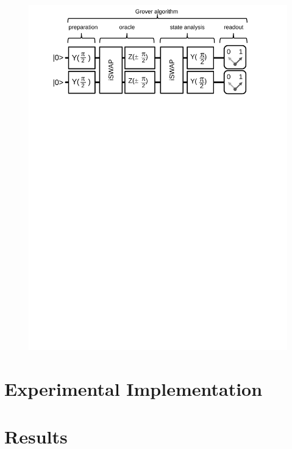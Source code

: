 \begin{figure}
	\centering
		\includegraphics[width=1.\textwidth]{./material/papers/grover/figures/grover_algorithm_schematic}
	\label{fig:GroverAlgorithmSchematic}
	\caption{}
\end{figure}

\section{Experimental Implementation}


\section{Results}


